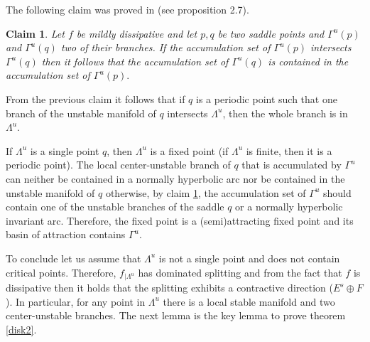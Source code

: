 \documentclass[a4paper,11pt]{article}
\newtheorem{claim}[lemma]{Claim}
\theoremstyle{definition}
\def\La{\Lambda}
\def\Ga{\Gamma}
\def\La{\Lambda}
\def\Ga{\Gamma}
\begin{document}
\medskip

The following claim was proved in \cite{CPT} (see proposition 2.7).

\begin{claim}\label{cpt-lemma} Let $f$ be mildly dissipative and let $p,q$ be  two saddle points and $\Ga^u(p)$ and $\Ga^u(q)$ two of  their branches. If the accumulation set of $\Ga^u(p)$ intersects $\Ga^u(q)$ then it follows that the accumulation set of $\Ga^u(q)$ is contained in the accumulation set of  $\Ga^u(p).$ 
    
\end{claim}

From the previous claim it follows that if $q$ is a periodic point such that one branch  of the unstable manifold of $q$ intersects $\La^u$, then the whole branch is in $\La^u.$


If $\Lambda^u$ is a single point $q$, then $\La^u$  is a fixed point (if $\La^u$ is  finite, then it is a periodic point). The local center-unstable branch of $q$ that is accumulated by $\Ga^u$ can neither be contained in a normally hyperbolic arc nor be contained in the unstable manifold of $q$  otherwise, by claim \ref{cpt-lemma}, the accumulation set of $\Gamma^u$ should contain one of the unstable branches of the saddle $q$ or a normally hyperbolic invariant arc. Therefore, the fixed point is a (semi)attracting fixed point and its basin of attraction contains $\Gamma^u$. 

To conclude let us assume that $\La^u$ is not a single point and does not contain critical points. Therefore,  $f_{|\La^u}$ has dominated splitting and from the fact that $f$ is dissipative then it holds that  the splitting exhibits a contractive direction ($E^s\oplus F$). In particular, for any point in $\La^u$ there is a local stable manifold and two  center-unstable branches. The next lemma is the key lemma to prove theorem \ref{disk2}.
\end{document}
